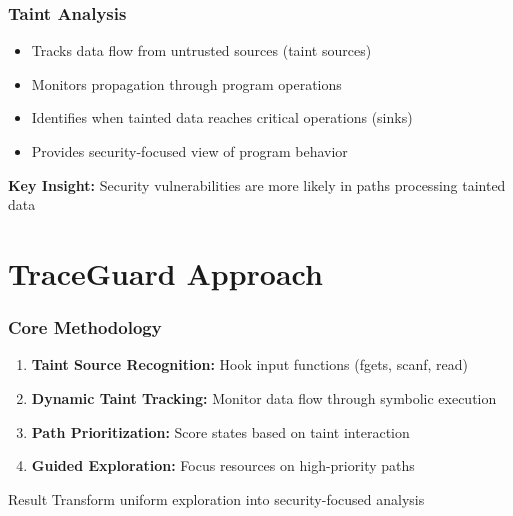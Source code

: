 \documentclass[aspectratio=169]{beamer}
\begin{document}
\begin{frame}
    \frametitle{Taint Analysis}
    \begin{itemize}
        \item Tracks data flow from untrusted sources (taint sources)
        \item Monitors propagation through program operations
        \item Identifies when tainted data reaches critical operations (sinks)
        \item Provides security-focused view of program behavior
    \end{itemize}
    
    \vspace{1em}
    \textbf{Key Insight:} Security vulnerabilities are more likely in paths processing tainted data
\end{frame}

\section{TraceGuard Approach}

\begin{frame}
    \frametitle{Core Methodology}
    \begin{enumerate}
        \item \textbf{Taint Source Recognition:} Hook input functions (fgets, scanf, read)
        \item \textbf{Dynamic Taint Tracking:} Monitor data flow through symbolic execution
        \item \textbf{Path Prioritization:} Score states based on taint interaction
        \item \textbf{Guided Exploration:} Focus resources on high-priority paths
    \end{enumerate}
    
    \vspace{1em}
    \begin{evaluation}{Result}
        Transform uniform exploration into security-focused analysis
    \end{evaluation}
\end{frame}
\end{document}
